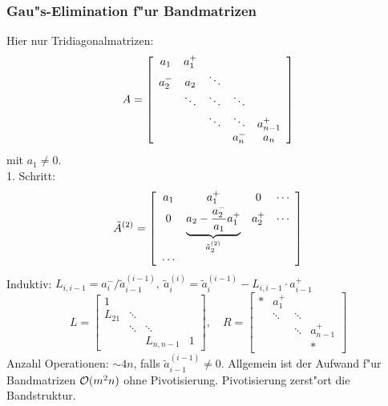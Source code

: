 \documentclass{scrartcl}
\begin{document}
\subsubsection*{Gau"s-Elimination f"ur Bandmatrizen} 
Hier nur Tridiagonalmatrizen:
$$ A=
\left[
\begin{array}{c c c c c c}
a_1 & a_1^+ \\
a_2^- & a_2 & \ddots \\
& \ddots & \ddots & \ddots \\
& & \ddots & \ddots & a_{n-1}^+ \\
& & & a_n^- & a_n
\end{array}
\right]
$$
mit $a_1 \neq 0$. \\
1. Schritt: \\
$$
\tilde A^{(2)} = \left[
\begin{array}{c c c c}
a_1 & a_1^+ & 0 & \cdots \\
0 & \underbrace{a_2 - \frac{a_2^-}{a_1} a_1^+}_{\tilde a_2^{(2)}} & a_2^+ & \cdots \\
\cdots
\end{array}
\right]
$$
Induktiv: $L_{i,i-1} = a_i^- / \tilde a_{i-1}^{(i-1)}, \ \tilde a_i^{(i)} = \tilde a_i^{(i-1)} - L_{i,i-1} \cdot a_{i-1}^+$
$$ L = \left[ \begin{matrix} 1 & & \\ L_{21} & \ddots \\ & \ddots & \ddots \\ & & L_{n,n-1} & 1  \end{matrix} \right], \quad R = \left[ \begin{matrix} * & a_1^+ \\ & \ddots & \ddots \\ & & \ddots & a_{n-1}^+ \\ & & & *\end{matrix} \right]$$
Anzahl Operationen: $\sim 4n$, falls $\tilde a_{i-1}^{(i-1)} \neq 0$. Allgemein ist der Aufwand f"ur Bandmatrizen $\mathcal{O} (m^2n)$ ohne Pivotisierung. Pivotisierung zerst"ort die Bandstruktur.
\end{document}
